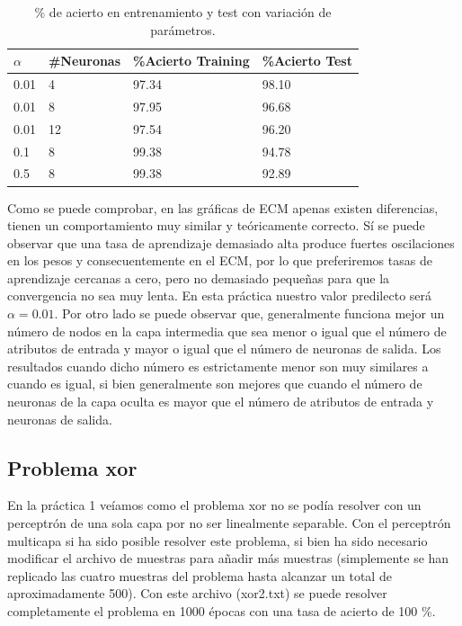 \documentclass[spanish]{assignment}
\begin{document}
	\begin{table}[ht!]
		\centering
		\begin{tabular}{|l|l|l|l|}
			\hline
			\textbf{$\alpha$} & \textbf{\#Neuronas} & \textbf{ \%Acierto Training} & \textbf{\%Acierto Test} \\ \hline
			0.01& 4 & 97.34 & 98.10 \\ \hline
			0.01& 8 & 97.95 & 96.68 \\ \hline
			0.01& 12 & 97.54 & 96.20 \\ \hline
			0.1& 8 & 99.38 & 94.78 \\ \hline
			0.5& 8 & 99.38 & 92.89 \\ \hline
		\end{tabular}
		\caption{\% de acierto en entrenamiento y test con variación de parámetros.}
		\label{tab:pr1chart}
	\end{table}
	
	Como se puede comprobar, en las gráficas de ECM apenas existen diferencias, tienen un comportamiento muy similar y teóricamente correcto. Sí se puede observar que una tasa de aprendizaje demasiado alta produce fuertes oscilaciones en los pesos y consecuentemente en el ECM, por lo que preferiremos tasas de aprendizaje cercanas a cero, pero no demasiado pequeñas para que la convergencia no sea muy lenta. En esta práctica nuestro valor predilecto será $\alpha = 0.01$. Por otro lado se puede observar que, generalmente funciona mejor un número de nodos en la capa intermedia que sea menor o igual que el número de atributos de entrada y mayor o igual que el número de neuronas de salida. Los resultados cuando dicho número es estrictamente menor son muy similares a cuando es igual, si bien generalmente son mejores que cuando el número de neuronas de la capa oculta es mayor que el número de atributos de entrada y neuronas de salida.
	
	\subsection{Problema xor}
	En la práctica 1 veíamos como el problema xor no se podía resolver con un perceptrón de una sola capa por no ser linealmente separable. Con el perceptrón multicapa si ha sido posible resolver este problema, si bien ha sido necesario modificar el archivo de muestras para añadir más muestras (simplemente se han replicado las cuatro muestras del problema hasta alcanzar un total de aproximadamente 500). Con este archivo (xor2.txt) se puede resolver completamente el problema en 1000 épocas con una tasa de acierto de 100 \%.
	
\end{document}
